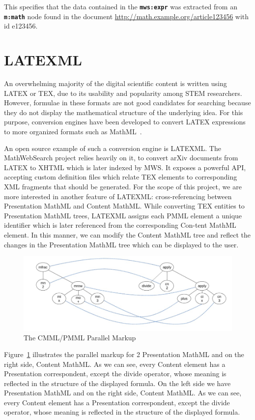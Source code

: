 \documentclass{deliverablereport}
\begin{document}
This specifies that the data contained in the \textbf{\texttt{mws:expr}} was extracted from an \textbf{\texttt{m:math}} node found in the document \url{http://math.example.org/article123456} with id e123456.

\section{LATEXML}\label{sec:ml}
An overwhelming majority of the digital scientific content is written using LATEX or TEX,
due to its usability and popularity among STEM researchers. However, formulae in these
formats are not good candidates for searching because they do not display the mathematical
structure of the underlying idea. For this purpose, conversion engines have been developed
to convert LATEX expressions to more organized formats such as MathML~\cite{Ham:bcs15}.

An open source example of such a conversion engine is LATEXML. The MathWebSearch project
relies heavily on it, to convert arXiv documents from LATEX to XHTML which is later
indexed by MWS. It exposes a powerful API, accepting custom definition files which relate
TEX elements to corresponding XML fragments that should be generated. For the scope of
this project, we are more interested in another feature of LATEXML: cross-referencing
between Presentation MathML and Content MathML. While converting TEX entities to
Presentation MathML trees, LATEXML assigns each PMML element a unique identifier which is
later referenced from the corresponding Con-tent MathML element. In this manner, we can
modify the Content MathML tree and reflect the changes in the Presentation MathML tree
which can be displayed to the user.
 

\begin{figure}[h]
\centering
 \includegraphics[scale=0.6]{figure2.jpg}
 \caption{The CMML/PMML Parallel Markup}
 \label{fig:markup}
\end{figure}

Figure~\ref{fig:markup} illustrates the parallel markup for 2 Presentation MathML and on the right side,
Content MathML. As we can see, every Content element has a Presentation correspondent,
except the divide operator, whose meaning is reflected in the structure of the displayed
formula. On the left side we have Presentation MathML and on the right side, Content
MathML. As we can see, every Content element has a Presentation correspondent, except the
divide operator, whose meaning is reflected in the structure of the displayed formula.
\end{document}
